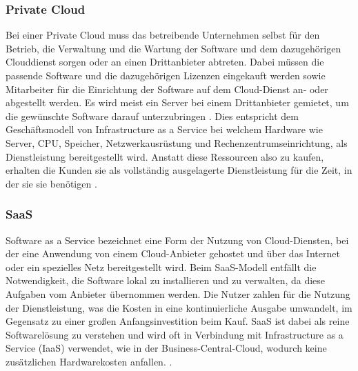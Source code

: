 \documentclass[12pt,bibtotoc]{article}
\begin{document}
		\subsubsection{Private Cloud}
		Bei einer Private Cloud muss das betreibende Unternehmen selbst für den Betrieb, die Verwaltung und die Wartung der Software und dem dazugehörigen Clouddienst sorgen oder an einen Drittanbieter abtreten.
		Dabei müssen die passende Software und die dazugehörigen Lizenzen eingekauft werden sowie Mitarbeiter für die Einrichtung der Software auf dem Cloud-Dienst an- oder abgestellt werden.
		Es wird meist ein Server bei einem Drittanbieter gemietet, um die gewünschte Software darauf unterzubringen \cite{Anhang}. \newline
		Dies entspricht dem Geschäftsmodell von Infrastructure as a Service bei welchem Hardware wie Server, CPU, Speicher, Netzwerkausrüstung und Rechenzentrumseinrichtung, als Dienstleistung bereitgestellt wird.
		Anstatt diese Ressourcen also zu kaufen, erhalten die Kunden sie als vollständig ausgelagerte Dienstleistung für die Zeit, in der sie sie benötigen \cite{Murugesan.2016}.
		\subsubsection{SaaS}
		Software as a Service bezeichnet eine Form der Nutzung von Cloud-Diensten, bei der eine Anwendung von einem Cloud-Anbieter gehostet und über das Internet oder ein spezielles Netz bereitgestellt wird. Beim SaaS-Modell entfällt die Notwendigkeit, die Software lokal zu installieren und zu verwalten, da diese Aufgaben vom Anbieter übernommen werden. Die Nutzer zahlen für die Nutzung der Dienstleistung, was die Kosten in eine kontinuierliche Ausgabe umwandelt, im Gegensatz zu einer großen Anfangsinvestition beim Kauf. SaaS ist dabei als reine Softwarelösung zu verstehen und wird oft in Verbindung mit Infrastructure as a Service (IaaS) verwendet, wie in der Business-Central-Cloud, wodurch keine zusätzlichen Hardwarekosten anfallen. \cite{Murugesan.2016}\cite{Anhang}.
		
\end{document}
